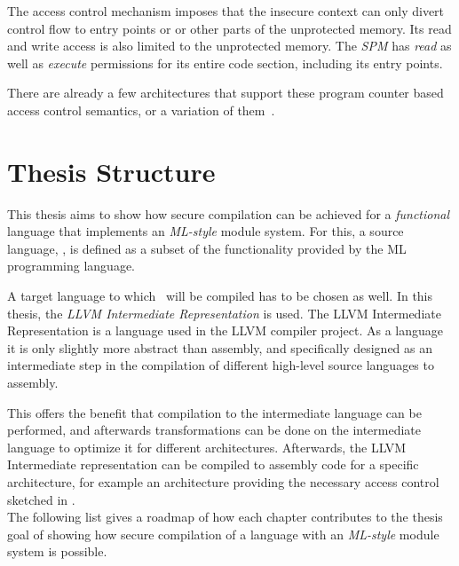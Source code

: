 The access control mechanism imposes that the insecure context can only divert control flow to entry points or or other parts of the unprotected memory.
Its read and write access is also limited to the unprotected memory.
The \emph{SPM} has \emph{read} as well as \emph{execute} permissions for its entire code section, including its entry points.

There are already a few architectures that support these program counter based access control semantics, or a variation of them~\cite{Fides, Salus, Sancus}.

\section{Thesis Structure}
This thesis aims to show how secure compilation can be achieved for a \emph{functional} language that implements an \emph{ML-style} module system.
For this, a source language, \emph{\MiniML}, is defined as a subset of the functionality provided by the ML programming language.

A target language to which \MiniML\ will be compiled has to be chosen as well.
In this thesis, the \emph{LLVM Intermediate Representation} is used.
The LLVM Intermediate Representation is a language used in the LLVM compiler project.
As a language it is only slightly more abstract than assembly, and specifically designed as an intermediate step in the compilation of different high-level source languages to assembly.

This offers the benefit that compilation to the intermediate language can be performed, and afterwards transformations can be done on the intermediate language to optimize it for different architectures.
Afterwards, the LLVM Intermediate representation can be compiled to assembly code for a specific architecture, for example an architecture providing the necessary access control sketched in .
\\[1em]
The following list gives a roadmap of how each chapter contributes to the thesis goal of showing how secure compilation of a language with an \emph{ML-style} module system is possible.

